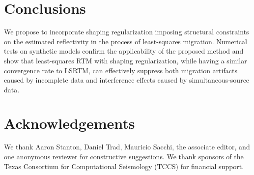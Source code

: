 \section{Conclusions}
We propose to incorporate shaping regularization imposing structural constraints on the estimated reflectivity in the process of least-squares migration.
Numerical tests on synthetic models confirm the applicability of the proposed method and show that
least-squares RTM with shaping regularization, while having a similar convergence rate to LSRTM, 
can effectively suppress both migration artifacts caused by incomplete data and interference effects caused by simultaneous-source data.

\section{Acknowledgements}
We thank Aaron Stanton, Daniel Trad, Mauricio Sacchi, the associate editor, and one anonymous reviewer for constructive suggestions.
We thank sponsors of the Texas Consortium for Computational Seismology (TCCS) for financial support. 



